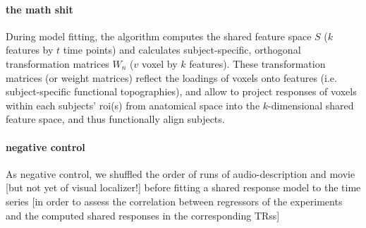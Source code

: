 %
%


\paragraph{the math shit}


%
During model fitting, the algorithm computes the shared feature space $S$ ($k$
features by $t$ time points) and calculates subject-specific, orthogonal
transformation matrices $W_{n}$ ($v$ voxel by $k$ features).
%
These transformation matrices (or weight matrices) reflect the loadings of
voxels onto features (i.e. subject-specific functional topographies), and allow
to project responses of voxels within each subjects' \ac{roi}(s) from anatomical
space into the $k$-dimensional shared feature space, and thus functionally align
subjects.


\paragraph{negative control}



As negative control, we shuffled the order of runs of audio-description and
movie [but not yet of visual localizer!] before fitting a shared response model
to the time series [in order to assess the correlation between regressors of the
experiments and the computed shared responses in the corresponding \acp{TRs}]


